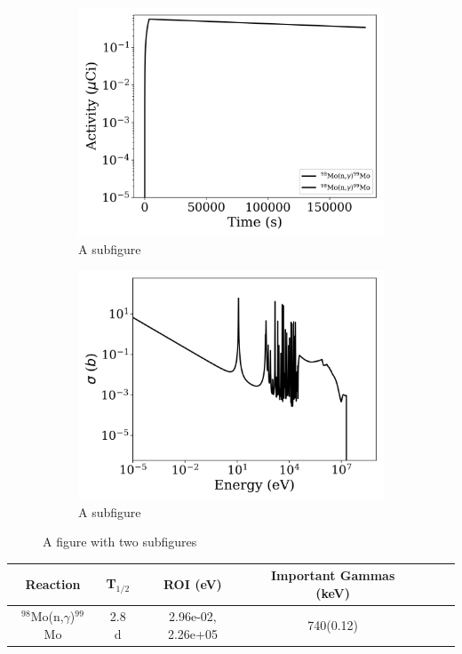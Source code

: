\begin{figure}[h]
\centering
\begin{subfigure}{.5\textwidth}
  \centering
     \includegraphics[width=.8\textwidth]{plot/Mo-98(n,gamma)Mo-99_library1} 

  \caption{A subfigure}
  \label{fig:sub1}
\end{subfigure}%
\begin{subfigure}{.5\textwidth}
  \centering
     \includegraphics[width=.8\textwidth]{plot/Mo-98(n,gamma)Mo-99} 

  \caption{A subfigure}
  \label{fig:sub2}
\end{subfigure}
\caption{A figure with two subfigures}
\label{fig:test}
\end{figure}

\begin{table}[h]
\centering
\begin{tabular}{ |c|c|c|c|c|c|c| }
 \hline
 Reaction & T$_{1/2}$ & ROI (eV) & Important Gammas (keV) \\
 \hline 
 $^{98}$Mo(n,$\gamma$)$^{99}$Mo &  2.8 d & 2.96e-02, 2.26e+05 & 740(0.12) \\ 
\hline
\end{tabular}
\end{table}
